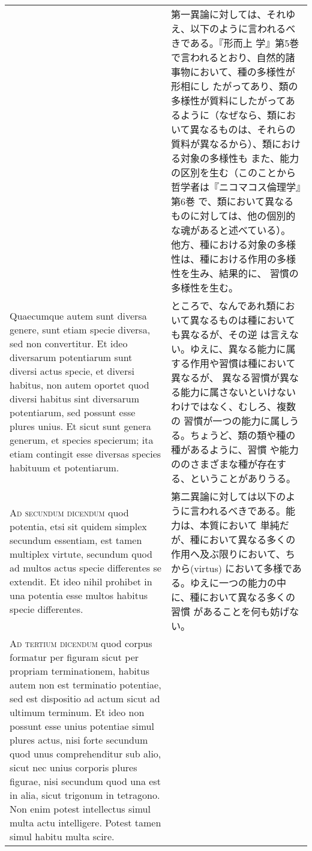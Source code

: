 \documentclass[10pt]{jsarticle} %
\begin{document}
\begin{longtable}{p{21em}p{21em}}
&

第一異論に対しては、それゆえ、以下のように言われるべきである。『形而上
学』第5巻で言われるとおり、自然的諸事物において、種の多様性が形相にし
たがってあり、類の多様性が質料にしたがってあるように（なぜなら、類にお
いて異なるものは、それらの質料が異なるから）、類における対象の多様性も
また、能力の区別を生む（このことから哲学者は『ニコマコス倫理学』第6巻
で、類において異なるものに対しては、他の個別的な魂があると述べている）。
他方、種における対象の多様性は、種における作用の多様性を生み、結果的に、
習慣の多様性を生む。


\\



Quaecumque autem sunt diversa genere, sunt etiam specie diversa, sed
non convertitur. Et ideo diversarum potentiarum sunt diversi actus
specie, et diversi habitus, non autem oportet quod diversi habitus
sint diversarum potentiarum, sed possunt esse plures unius. Et sicut
sunt genera generum, et species specierum; ita etiam contingit esse
diversas species habituum et potentiarum.

&

ところで、なんであれ類において異なるものは種においても異なるが、その逆
は言えない。ゆえに、異なる能力に属する作用や習慣は種において異なるが、
異なる習慣が異なる能力に属さないといけないわけではなく、むしろ、複数の
習慣が一つの能力に属しうる。ちょうど、類の類や種の種があるように、習慣
や能力ののさまざまな種が存在する、ということがありうる。


\\




{\scshape Ad secundum dicendum} quod potentia, etsi sit quidem simplex secundum
essentiam, est tamen multiplex virtute, secundum quod ad multos actus
specie differentes se extendit. Et ideo nihil prohibet in una potentia
esse multos habitus specie differentes.

&

第二異論に対しては以下のように言われるべきである。能力は、本質において
単純だが、種において異なる多くの作用へ及ぶ限りにおいて、ちから(virtus)
において多様である。ゆえに一つの能力の中に、種において異なる多くの習慣
があることを何も妨げない。

\\




{\scshape Ad tertium dicendum} quod corpus formatur per figuram sicut
per propriam terminationem, habitus autem non est terminatio
potentiae, sed est dispositio ad actum sicut ad ultimum terminum. Et
ideo non possunt esse unius potentiae simul plures actus, nisi forte
secundum quod unus comprehenditur sub alio, sicut nec unius corporis
plures figurae, nisi secundum quod una est in alia, sicut trigonum in
tetragono. Non enim potest intellectus simul multa actu
intelligere. Potest tamen simul habitu multa scire.


\end{longtable}
\end{document}
